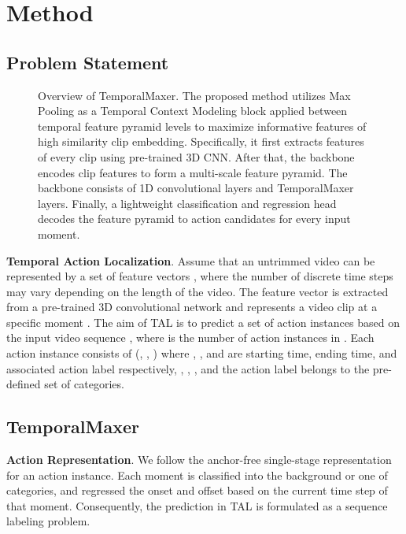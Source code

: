 \documentclass[10pt,twocolumn,letterpaper]{article}
\begin{document}
 \section{Method}
\subsection{Problem Statement}
\begin{figure*}[t]
\centering
\begin{center}
\end{center}
\caption{Overview of TemporalMaxer. The proposed method utilizes Max Pooling as a Temporal Context Modeling block applied between temporal feature pyramid levels to maximize informative features of high similarity clip embedding. Specifically, it first extracts features of every clip using pre-trained 3D CNN. After that, the backbone encodes clip features to form a multi-scale feature pyramid. The backbone consists of 1D convolutional layers and TemporalMaxer layers. Finally, a lightweight classification and regression head decodes the feature pyramid to action candidates for every input moment.}
\label{fig:architecture}
\end{figure*}

\textbf{Temporal Action Localization}. Assume that an untrimmed video  can be represented by a set of feature vectors , where the number of discrete time steps  may vary depending on the length of the video. The feature vector  is extracted from a pre-trained 3D convolutional network and represents a video clip at a specific moment . The aim of TAL is to predict a set of action instances  based on the input video sequence , where  is the number of action instances in . Each action instance  consists of (, , ) where , , and  are starting time, ending time, and associated action label  respectively, , , , and the action label  belongs to the pre-defined set of  categories.



\subsection{TemporalMaxer}


\textbf{Action Representation}. We follow the anchor-free single-stage representation \cite{lin2021learning, zhang2022actionformer} for an action instance. Each moment is classified into the background or one of  categories, and regressed the onset and offset based on the current time step of that moment. Consequently, the prediction in TAL is formulated as a sequence labeling problem.
\end{document}
